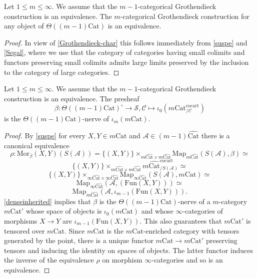 \documentclass[10pt,oneside]{article}
\numberwithin{equation}{section} %
\numberwithin{figure}{section} %
\theoremstyle{plain}
\theoremstyle{definition}
\newcommand{\mA}{{\mathcal A}}
\newcommand{\mC}{{\mathcal C}}
\newcommand{\mS}{{\mathcal S}}
\newcommand{\m}{{m}}
\newcommand{\Cat}{\mathrm{Cat}}
\newcommand{\Fun}{\mathrm{Fun}}
\newcommand{\cocart}{{\mathrm{cocart}}}
\newcommand{\Map}{{\mathrm{Map}}}
\newcommand{\Mor}{{\mathrm{Mor}}}
\begin{document}
\begin{corollary}\label{suspe2} Let $1 \leq \m \leq \infty.$
We assume that the $m-1$-categorical Grothendieck construction is an equivalence.
The $m$-categorical Grothendieck construction for any object of 
$\Theta((m-1)\Cat)$ is an equivalence.


\end{corollary}

\begin{proof}
In view of \cref{Grothendieck-char} this follows immediately from \cref{suspe} and \cref{Segal},
where we use that the category of categories having small colimits and functors preserving small colimits admits large limits preserved by the inclusion to the category of large categories.
\end{proof}

\begin{corollary}\label{repro}
Let $1 \leq \m \leq \infty.$
We assume that the $m-1$-categorical Grothendieck construction is an equivalence.
The presheaf $$\beta: \Theta((m-1)\Cat)^\circ \to \mS, \mC \mapsto \iota_0(m\Cat^\cocart_{/\mC})$$ is the $\Theta((m-1)\Cat)$-nerve of $\iota_m(m\Cat).$
  
\end{corollary}

\begin{proof}
By \cref{suspe} for every $X, Y \in m\Cat$ and $\mA \in (m-1)\widehat{\Cat} $ there is a canonical equivalence
$$\rho: \Mor_\beta(X,Y)(S(\mA)) = \{(X,Y)\}\times_{m\widehat{\Cat} \times m\widehat{\Cat}} \Map_{m\widehat{\Cat}}(S(\mA),\beta) \simeq $$$$ \{(X,Y)\}\times_{m\widehat{\Cat} \times m\widehat{\Cat}} m\widehat{\Cat}^\cocart_{/S(\mA)} \simeq $$
$$\{(X,Y)\}\times_{\infty\widehat{\Cat} \times \infty\widehat{\Cat}} \Map_{\infty\widehat{\Cat}}(S(\mA),m\Cat) \simeq $$$$\Map_{\infty\widehat{\Cat}}(\mA,(\Fun(X,Y))) 
\simeq $$$$ \Map_{m\widehat{\Cat}}(\mA,\iota_{m-1}(\Fun(X,Y))).$$
\cref{denseinherited} implies that $\beta$ is the $\Theta((m-1)\Cat)$-nerve of 
a $m$-category $m\Cat'$ whose space of objects is $\iota_0(m\Cat)$
and whose $\infty$-categories of morphisms $X \to Y$ are $\iota_{m-1}(\Fun(X,Y)).$
This also guarantees that $m\Cat'$ is tensored over $m\Cat$.
Since $m\Cat$ is the $m\Cat$-enriched category with tensors generated by the point, there is a unique functor $m\Cat \to m\Cat'$ preserving tensors and inducing the identity on spaces of objects. 
The latter functor induces the inverse of the equivalence 
$\rho$ on morphism $\infty$-categories and so is an equivalence.
\end{proof}
\end{document}
